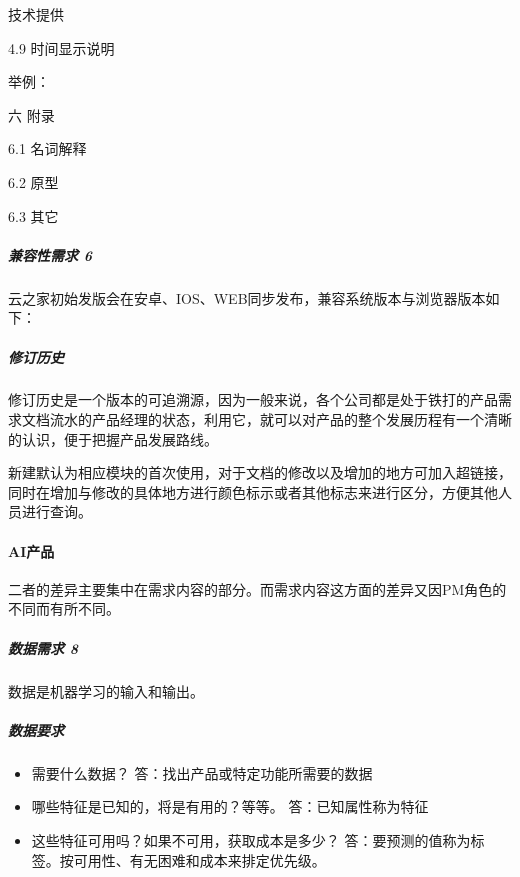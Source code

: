 \documentclass[letterpaper,11pt,english]{sphinxmanual}
\begin{document}
技术提供

4.9 时间显示说明

举例：

六 附录

6.1 名词解释

6.2 原型

6.3 其它


\subparagraph{兼容性需求 6\sphinxfootnotemark[494]}
\label{\detokenize{chapter_knowledge/PRD:id19}}%
\begin{footnotetext}[494]\sphinxAtStartFootnote
{}
%
\end{footnotetext}\ignorespaces 
云之家初始发版会在安卓、IOS、WEB同步发布，兼容系统版本与浏览器版本如下：


\subparagraph{修订历史}
\label{\detokenize{chapter_knowledge/PRD:id20}}
修订历史是一个版本的可追溯源，因为一般来说，各个公司都是处于铁打的产品需求文档流水的产品经理的状态，利用它，就可以对产品的整个发展历程有一个清晰的认识，便于把握产品发展路线。

新建默认为相应模块的首次使用，对于文档的修改以及增加的地方可加入超链接，同时在增加与修改的具体地方进行颜色标示或者其他标志来进行区分，方便其他人员进行查询。


\paragraph{AI产品}
\label{\detokenize{chapter_knowledge/PRD:ai}}
二者的差异主要集中在需求内容的部分。而需求内容这方面的差异又因PM角色的不同而有所不同。



\subparagraph{数据需求 8\sphinxfootnotemark[495]}
\label{\detokenize{chapter_knowledge/PRD:id21}}%
\begin{footnotetext}[495]\sphinxAtStartFootnote
{}
%
\end{footnotetext}\ignorespaces 
数据是机器学习的输入和输出。


\subparagraph{数据要求}
\label{\detokenize{chapter_knowledge/PRD:id22}}\begin{itemize}
\item {} 
需要什么数据？ 答：找出产品或特定功能所需要的数据

\item {} 
哪些特征是已知的，将是有用的？等等。 答：已知属性称为特征

\item {} 
这些特征可用吗？如果不可用，获取成本是多少？
答：要预测的值称为标签。按可用性、有无困难和成本来排定优先级。

\end{itemize}
\end{document}
